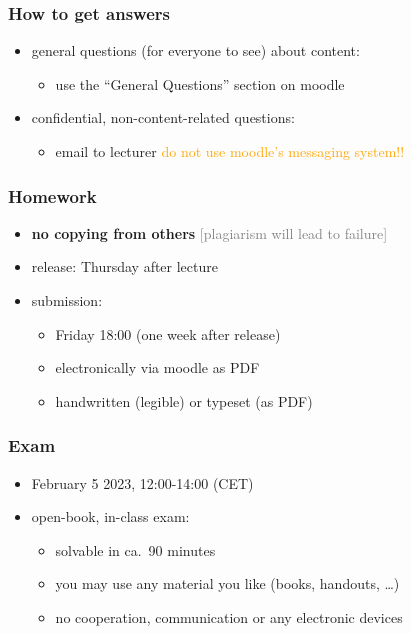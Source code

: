 \documentclass[fleqn,10pt,serif,xcolor=svgnames,xcolor=table,aspectratio=169]{beamer}
\newcommand{\mycom}[1]{\hfill {\mygray{[#1]}}}
\newcommand{\mygray}[1]{\textcolor{gray}{#1}}
\begin{document}
\begin{frame}
  \frametitle{How to get answers}
  \begin{itemize}
    \item general questions (for everyone to see) about content:
    \begin{itemize}
      \item use the ``General Questions'' section on moodle
    \end{itemize}
    \item confidential, non-content-related questions:
    \begin{itemize}
      \item email to lecturer \hfill \textcolor{orange}{do not use moodle's messaging system!!}
    \end{itemize}
  \end{itemize}
\end{frame}

\begin{frame}
  \frametitle{Homework}
  \begin{itemize}
    \item \textbf{no copying from others} \hfill \mycom{plagiarism will lead to failure}
    \item release: Thursday after lecture
    \item submission:
    \begin{itemize}
      \item Friday 18:00 (one week after release)
      \item electronically via moodle as PDF
      \item handwritten (legible) or typeset (as PDF)
    \end{itemize}
  \end{itemize}
\end{frame}

\begin{frame}
  \frametitle{Exam}
  \begin{itemize}
    \item February 5 2023, 12:00-14:00 (CET)
    \item open-book, in-class exam:
    \begin{itemize}
      \item solvable in ca.~90 minutes
      \item you may use any material you like (books, handouts, \dots)
      \item no cooperation, communication or any electronic devices
    \end{itemize}
  \end{itemize}
\end{frame}
\end{document}
